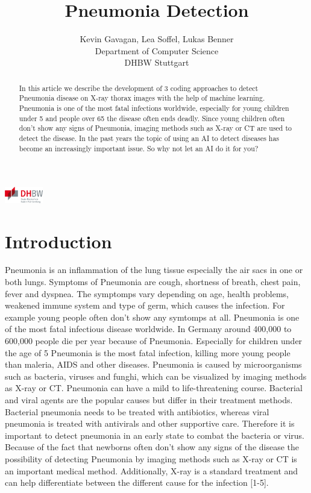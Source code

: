 \documentclass{article}
\title{Pneumonia Detection}
\author{
  Kevin Gavagan, Lea Soffel, Lukas Benner\\
  Department of Computer Science\\
  DHBW Stuttgart\\
}
\begin{document}
\begin{center}
\includegraphics[height=0.7cm]{images/dhbw_logo.png}
\end{center}

\maketitle

\begin{abstract}
In this article we describe the development of 3 coding approaches to detect Pneumonia disease on X-ray thorax images with the help of machine learning. 
Pneumonia is one of the most fatal infections worldwide, especially for young children under 5 and people over 65 the disease often ends deadly.
Since young children often don't show any signs of Pneumonia, imaging methods such as X-ray or CT are used to detect the disease.
In the past years the topic of using an AI to detect diseases has become an increasingly important issue. So why not let an AI do it for you?
\end{abstract}

\section{Introduction}	

Pneumonia is an inflammation of the lung tissue especially the air sacs in one or both lungs. 
Symptoms of Pneumonia are cough, shortness of breath, chest pain, fever and dyspnea. 
The symptomps vary depending on age, health problems, weakened immune system and type of germ, 
which causes the infection. For example young people often don't show any symtomps at all. 
Pneumonia is one of the most fatal infectious disease worldwide. 
In Germany around 400,000 to 600,000 people die per year because of Pneumonia. 
Especially for children under the age of 5 Pneumonia is the most fatal infection, 
killing more young people than maleria, AIDS and other diseases. 
Pneumonia is caused by microorganisms such as bacteria, viruses and funghi, 
which can be visualized by imaging methods as X-ray or CT. Pneumonia can have a mild to life-threatening course. 
Bacterial and viral agents are the popular causes but differ in their treatment methods. 
Bacterial pneumonia needs to be treated with antibiotics, 
whereas viral pneumonia is treated with antivirals and other supportive care. 
Therefore it is important to detect pneumonia in an early state to combat the bacteria or virus. 
Because of the fact that newborns often don't show any signs of the disease the possibility of detecting 
Pneumonia by imaging methods such as X-ray or CT is an important medical method. Additionally, 
X-ray is a standard treatment and can help differentiate between the different cause for the infection [1-5].
\end{document}

